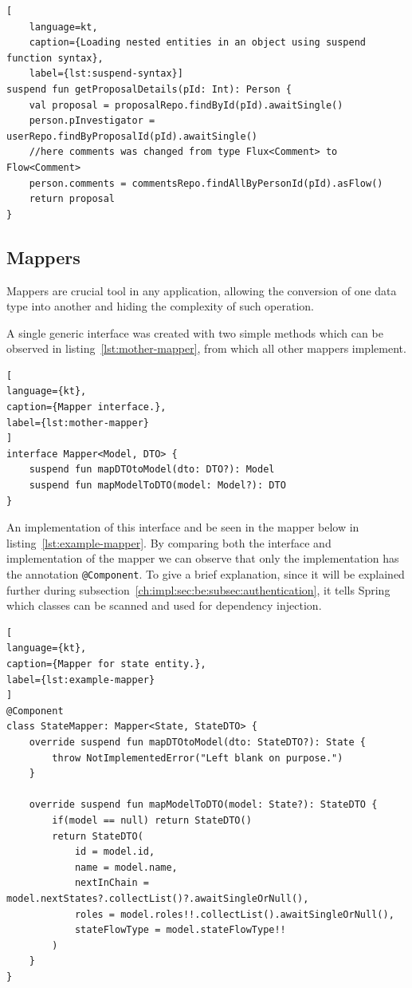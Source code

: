 \begin{lstlisting}[
    language=kt, 
    caption={Loading nested entities in an object using suspend function syntax},
    label={lst:suspend-syntax}]
suspend fun getProposalDetails(pId: Int): Person {
    val proposal = proposalRepo.findById(pId).awaitSingle()
    person.pInvestigator = userRepo.findByProposalId(pId).awaitSingle()
    //here comments was changed from type Flux<Comment> to Flow<Comment>
    person.comments = commentsRepo.findAllByPersonId(pId).asFlow()
    return proposal
}    
\end{lstlisting}


\subsection{Mappers}\label{ch:impl:sec:be:subsec:mappers}

Mappers are crucial tool in any application, allowing the conversion of one data type into another and hiding the complexity of such operation. 

A single generic interface was created with two simple methods which can be observed in listing~\ref{lst:mother-mapper}, from which all other mappers implement.

\begin{lstlisting}[
language={kt},
caption={Mapper interface.},
label={lst:mother-mapper}
]
interface Mapper<Model, DTO> {
    suspend fun mapDTOtoModel(dto: DTO?): Model
    suspend fun mapModelToDTO(model: Model?): DTO
}
\end{lstlisting}

An implementation of this interface and be seen in the mapper below in listing~\ref{lst:example-mapper}. By comparing both the interface and implementation of the mapper we can observe that only the implementation has the annotation \lstinline{@Component}. To give a brief explanation, since it will be explained further during subsection~\ref{ch:impl:sec:be:subsec:authentication}, it tells Spring which classes can be scanned and used for dependency injection.

\begin{lstlisting}[
language={kt},
caption={Mapper for state entity.},
label={lst:example-mapper}
]
@Component
class StateMapper: Mapper<State, StateDTO> {
    override suspend fun mapDTOtoModel(dto: StateDTO?): State {
        throw NotImplementedError("Left blank on purpose.")
    }

    override suspend fun mapModelToDTO(model: State?): StateDTO {
        if(model == null) return StateDTO()
        return StateDTO(
            id = model.id,
            name = model.name,
            nextInChain = model.nextStates?.collectList()?.awaitSingleOrNull(),
            roles = model.roles!!.collectList().awaitSingleOrNull(),
            stateFlowType = model.stateFlowType!!
        )
    }
}    
\end{lstlisting}

